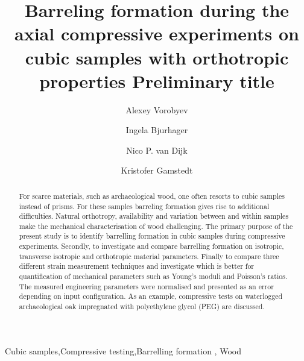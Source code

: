 \documentclass[review]{elsarticle}
\begin{document}
\begin{frontmatter}

\title{Barreling formation during the axial compressive experiments on cubic
samples with orthotropic properties {\color{red} Preliminary title}}







\author{Alexey Vorobyev}


\author{Ingela Bjurhager}
\author{Nico P. van Dijk}
\author{Kristofer Gamstedt}

\address{Uppsala University, Division of Appplied Mechanics,
Uppsala, Sweden }



\begin{abstract}
For scarce materials, such as archaeological wood, one often resorts to cubic
samples instead of prisms. For these samples barreling formation gives rise to additional difficulties.
Natural orthotropy, availability and variation between and within samples make
the mechanical characterisation of wood  challenging. 
The primary purpose of the present study is to identify barrelling
formation in cubic samples during compressive experiments. Secondly, to investigate and
compare barrelling formation on isotropic, transverse
isotropic and orthotropic material parameters. Finally to compare three 
different strain measurement techniques and investigate which is better for quantification 
of mechanical parameters such as Young's moduli and Poisson's ratios.
The measured engineering parameters were normalised and presented as an error
depending on input configuration.
As an example, compressive tests on waterlogged archaeological oak impregnated
with polyethylene glycol (PEG) are discussed.

\end{abstract}

\begin{keyword}
Cubic samples\sep Compressive testing\sep Barrelling formation \sep
Wood
\end{keyword}

\end{frontmatter}
\end{document}
